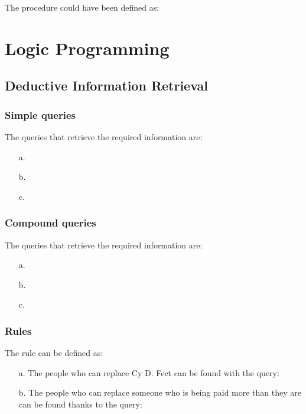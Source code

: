 \begin{exe}[4.54]
    The  procedure could have been defined as:
\end{exe}

\section{Logic Programming}

\subsection{Deductive Information Retrieval}

\subsubsection{Simple queries}

\begin{exe}[4.55]
    The queries that retrieve the required information are:
    \begin{itemize}
        \item[a.] 
        \item[b.] 
        \item[c.] 
    \end{itemize}
\end{exe}

\subsubsection{Compound queries}

\begin{exe}[4.56]
    The queries that retrieve the required information are:
    \begin{itemize}
        \item[a.] 
        \item[b.] 
        \item[c.] 
    \end{itemize}
\end{exe}

\subsubsection{Rules}

\begin{exe}[4.57]
    The rule  can be defined as:
    \begin{itemize}
        \item[a.] The people who can replace Cy D. Fect can be found with the 
            query:
        \item[b.] The people who can replace someone who is being paid more than 
            they are can be found thanks to the query:
    \end{itemize}
\end{exe}

